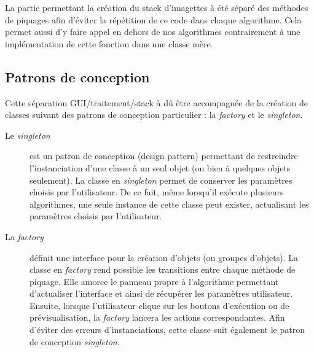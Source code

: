 La partie permettant la création du stack d'imagettes à été séparé des méthodes de piquages afin d'éviter la répétition de ce code dans chaque algorithme. Cela permet aussi d'y faire appel en dehors de nos algorithmes contrairement à une implémentation de cette fonction dans une classe mère.

\subsection{Patrons de conception}

Cette séparation GUI/traitement/stack à dû être accompagnée de la création de classes suivant des patrons de conception particulier : la \emph{factory} et le \emph{singleton}. 
\begin{description}
\item [Le \emph{singleton}] est un patron de conception (design pattern) permettant de restreindre l'instanciation d'une classe à un seul objet (ou bien à quelques objets seulement). La classe en \emph{singleton} permet de conserver les paramètres choisis par l'utilisateur. De ce fait, même lorsqu'il exécute plusieurs algorithmes, une seule instance de cette classe peut exister, actualisant les paramètres choisis par l'utilisateur.
\item[La \emph{factory}]\blue  définit une interface pour la création d'objets (ou groupes d'objets).\black %
La classe en \emph{factory} rend possible les transitions entre chaque méthode de piquage. Elle amorce le panneau propre à l'algorithme permettant d'actualiser l'interface et ainsi de récupérer les paramètres utilisateur. Ensuite, lorsque l'utilisateur clique sur les boutons d'exécution ou de prévisualisation, la \emph{factory} lancera les actions correspondantes. Afin d'éviter des erreurs d'instanciations, cette classe suit également le patron de conception \emph{singleton}.
\end{description}


